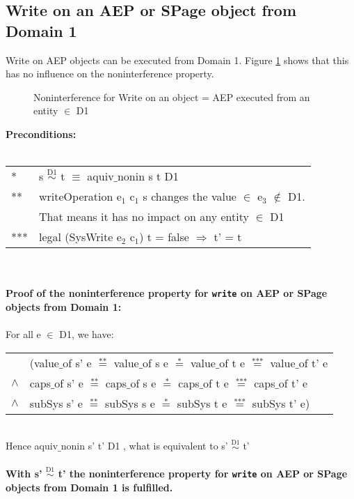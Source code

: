 \subsection{Write on an AEP or SPage object from Domain 1}\label{WriteOut2}
Write on AEP objects can be executed from Domain 1. Figure \ref{fig:WriteOut2} shows that this has no influence on the noninterference property.
\begin{figure}[H]
\caption{Noninterference for Write on an object = AEP executed from an entity $\in$ D1}
\label{fig:WriteOut2}
\end{figure}
\textbf{Preconditions:} \\ \\
\begin{tabular}{ll}
* & s $\overset{\text{D1}}{\sim}$ t $\equiv$ aquiv$\_$nonin s t D1	\\ 
** & writeOperation e$_1$ c$_1$ s changes the value $\in$ e$_3$ $\notin$ D1. \\
& That means it has no impact on any entity $\in$ D1 \\ 
*** & legal (SysWrite e$_2$ c$_1$) t = false $\Rightarrow$ t' = t
\end{tabular} \\ \\ 
\textbf{Proof of the noninterference property for \texttt{write} on AEP or SPage objects from Domain 1:}\\ \\
For all e $\in$ D1, we have: \\ 
\begin{tabular}{ll}
& (value$\_$of s' e $\overset{\text{**}}{=}$ value$\_$of s e $\overset{\text{*}}{=}$ value$\_$of t e $\overset{\text{***}}{=}$ value$\_$of t' e \\
$\wedge$ & caps$\_$of s' e $\overset{\text{**}}{=}$ caps$\_$of s e $\overset{\text{*}}{=}$ caps$\_$of t e $\overset{\text{***}}{=}$ caps$\_$of t' e \\
$\wedge$ & subSys s' e $\overset{\text{**}}{=}$ subSys s e $\overset{\text{*}}{=}$ subSys t e $\overset{\text{***}}{=}$ subSys t' e)
\end{tabular} \\
Hence aquiv$\_$nonin s' t' D1 , what is equivalent to s' $\overset{\text{D1}}{\sim}$ t'\\ \\ 
\textbf{With s' $\overset{\text{D1}}{\sim}$ t' the noninterference property for \texttt{write} on AEP or SPage objects from Domain 1 is fulfilled.} 